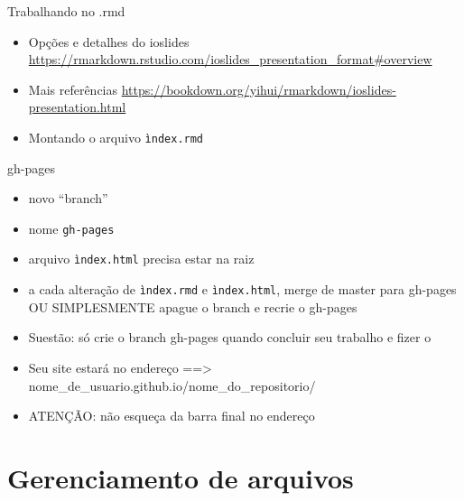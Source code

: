 \documentclass[
  10pt,
  ignorenonframetext,
]{beamer}
\begin{document}
\begin{frame}[fragile]{Trabalhando no .rmd}
\protect\hypertarget{trabalhando-no-.rmd}{}
\begin{itemize}
\item
  Opções e detalhes do ioslides
  \url{https://rmarkdown.rstudio.com/ioslides_presentation_format\#overview}
\item
  Mais referências
  \url{https://bookdown.org/yihui/rmarkdown/ioslides-presentation.html}
\item
  Montando o arquivo \texttt{ìndex.rmd}
\end{itemize}
\end{frame}

\begin{frame}[fragile]{gh-pages}
\protect\hypertarget{gh-pages}{}
\begin{itemize}
\item
  novo ``branch''
\item
  nome \texttt{gh-pages}
\item
  arquivo \texttt{ìndex.html} precisa estar na raiz
\item
  a cada alteração de \texttt{ìndex.rmd} e \texttt{ìndex.html}, merge de
  master para gh-pages OU SIMPLESMENTE apague o branch e recrie o
  gh-pages
\item
  Suestão: só crie o branch gh-pages quando concluir seu trabalho e
  fizer o
\item
  Seu site estará no endereço ==\textgreater{}
  nome\_de\_usuario.github.io/nome\_do\_repositorio/
\item
  ATENÇÃO: não esqueça da barra final no endereço
\end{itemize}
\end{frame}

\hypertarget{gerenciamento-de-arquivos}{%
\section{Gerenciamento de arquivos}\label{gerenciamento-de-arquivos}}
\end{document}
